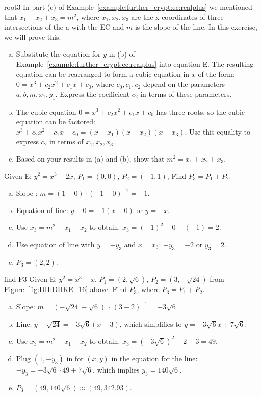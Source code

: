 \begin{exercise}{root3}
In part (c) of Example~\ref{example:further_crypt:ec:realplus} we mentioned that $x_1+x_2+x_3=m^2$, where $x_1,x_2,x_3$ are the x-coordinates of three intersections of the a with the EC and $m$ is the slope of the line.  In this exercise, we will prove this.
\begin{enumerate}[(a)]
\item
Substitute the equation for $y$ in (b) of Example~\ref{example:further_crypt:ec:realplus} into equation E. The resulting equation can be rearranged to form a cubic equation in $x$ of the form: $0 = x^3 + c_2 x^2 + c_1 x + c_0$, where $c_0,c_1, c_2$ depend on the parameters $a,b,m,x_1,y_1$. Express the coefficient $c_2$ in terms of these parameters.
\item
The cubic equation $0 = x^3 + c_2 x^2 + c_1 x + c_0$ has three roots, so the cubic equation can be factored:  $x^3 + c_2 x^2 + c_1 x + c_0 = (x-x_1)(x-x_2)(x-x_3)$. Use this equality to express $c_2$ in terms of $x_1, x_2, x_3$.
\item
Based on your results in (a) and (b), show that $m^2 = x_1 + x_2 + x_3$.
\end{enumerate}
\end{exercise}

\begin{example}{} 
Given E: $y^2 = x^3 - 2x$, $P_1 = (0,0)$, $P_2 = (-1,1)$, Find $P_3=P_1 + P_2$.
		
\begin{enumerate}[(a)]
\item
Slope :
$ m =(1 - 0) \cdot (-1- 0)^{-1}=-1$.
\item
Equation of line:	$y - 0 = -1(x- 0)$ or $y =-x $.
\item
Use $x_3 = m^2 - x_1 - x_2$ to obtain: $x_3 = (-1)^2 - 0 - (-1) = 2$.
\item
Use equation of line with $y=-y_3$ and $x=x_3$:  $-y_3 = -2$ or $y_3=2$.
\item
$P_3 = (2,2)$.
\end{enumerate}
\end{example}
\begin{example}{find P3} Given E: $y^2 = x^3 - x$, $P_1 = (2, \sqrt{6})$, $P_2 = (3, -\sqrt{24})$ from Figure~\ref{fig:DH:DHKE_16} above.
	Find $P_3$, where $P_3 = P_1 + P_2$.
\begin{enumerate}[(a)]
\item 
Slope: $m =( -\sqrt{24}-\sqrt{6})$ $\cdot$ $(3-2)^{-1} = -3\sqrt{6}  $ \\
\item
Line: $y + \sqrt{24} = -3\sqrt{6}(x - 3)$, which simplifies to $y = -3\sqrt{6}x + 7\sqrt{6}$.
\item 
Use $x_3 = m^2 - x_1 - x_2$ to obtain: $x_3 = (-3\sqrt{6})^2 - 2 - 3 = 49$.
\item
Plug $(1,-y_3)$ in for $(x,y)$ in the equation for the line: $-y_3 = -3\sqrt{6}\cdot 49+7 \sqrt{6}$, which implies $y_3 = 140\sqrt{6}$. 
\item
$P_3 = (49,140\sqrt{6}) \approx (49,342.93)$.
\end {enumerate}  
\end{example}

